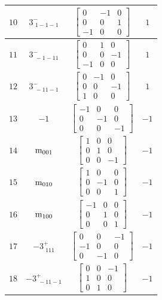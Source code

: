 \documentclass[fleqn,8pt]{jsarticle}
\begin{document}
\begin{longtable}{cccc}
$ 10 $ & $ 3^{-}_{\,\,1-1-1} $ & $ \begin{bmatrix} 0 & -1 & 0 \\ 0 & 0 & 1 \\ -1 & 0 & 0 \end{bmatrix} $ & $ 1 $ \\ \hline
$ 11 $ & $ 3^{-}_{\,\,-1-11} $ & $ \begin{bmatrix} 0 & 1 & 0 \\ 0 & 0 & -1 \\ -1 & 0 & 0 \end{bmatrix} $ & $ 1 $ \\ \hline
$ 12 $ & $ 3^{-}_{\,\,-11-1} $ & $ \begin{bmatrix} 0 & -1 & 0 \\ 0 & 0 & -1 \\ 1 & 0 & 0 \end{bmatrix} $ & $ 1 $ \\ \hline
$ 13 $ & $ -1 $ & $ \begin{bmatrix} -1 & 0 & 0 \\ 0 & -1 & 0 \\ 0 & 0 & -1 \end{bmatrix} $ & $ -1 $ \\ \hline
$ 14 $ & $ {\rm m}_{001} $ & $ \begin{bmatrix} 1 & 0 & 0 \\ 0 & 1 & 0 \\ 0 & 0 & -1 \end{bmatrix} $ & $ -1 $ \\ \hline
$ 15 $ & $ {\rm m}_{010} $ & $ \begin{bmatrix} 1 & 0 & 0 \\ 0 & -1 & 0 \\ 0 & 0 & 1 \end{bmatrix} $ & $ -1 $ \\ \hline
$ 16 $ & $ {\rm m}_{100} $ & $ \begin{bmatrix} -1 & 0 & 0 \\ 0 & 1 & 0 \\ 0 & 0 & 1 \end{bmatrix} $ & $ -1 $ \\ \hline
$ 17 $ & $ -3^{+}_{\,\,111} $ & $ \begin{bmatrix} 0 & 0 & -1 \\ -1 & 0 & 0 \\ 0 & -1 & 0 \end{bmatrix} $ & $ -1 $ \\ \hline
$ 18 $ & $ -3^{+}_{\,\,-11-1} $ & $ \begin{bmatrix} 0 & 0 & -1 \\ 1 & 0 & 0 \\ 0 & 1 & 0 \end{bmatrix} $ & $ -1 $ \\ \hline

\end{longtable}
\end{document}
